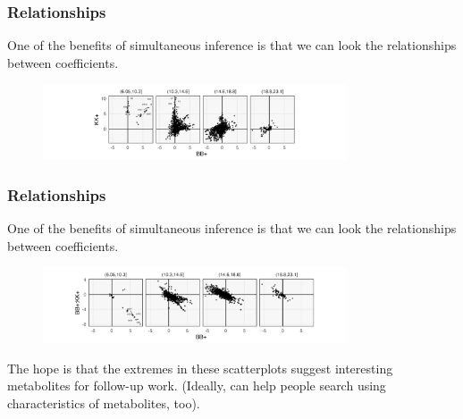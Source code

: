 \documentclass[hyperref={colorlinks=true, linkcolor=violet, citecolor=SeaGreen}]{beamer}
\begin{document}
\begin{frame}
  \frametitle{Relationships}
  One of the benefits of simultaneous inference is that we can look the
  relationships between coefficients.

  \begin{figure}
  \includegraphics[width=0.8\textwidth]{bk-scatter}
  \end{figure}
\end{frame}

\begin{frame}
  \frametitle{Relationships}
  One of the benefits of simultaneous inference is that we can look the
  relationships between coefficients.

  \begin{figure}
  \includegraphics[width=0.8\textwidth]{bbk-scatter}
  \end{figure}
\end{frame}

\begin{frame}
  The hope is that the extremes in these scatterplots suggest interesting
  metabolites for follow-up work. (Ideally, can help people search using
  characteristics of metabolites, too).
  \begin{figure}
  \end{figure}
\end{frame}
\end{document}

